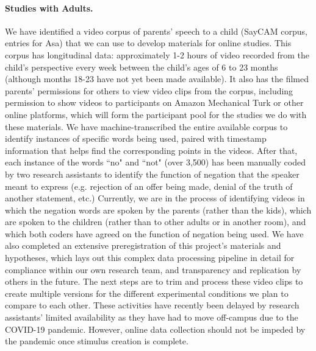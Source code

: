 \documentclass[11pt]{article}
\begin{document}
\paragraph{Studies with Adults.} We have identified a video corpus of parents' speech to a child (SayCAM corpus, entries for Asa) that we can use to develop materials for online studies. This corpus has longitudinal data: approximately 1-2 hours of video recorded from the child's perspective every week between the child's ages of 6 to 23 months (although months 18-23 have not yet been made available). It also has the filmed parents' permissions for others to view video clips from the corpus, including permission to show videos to participants on Amazon Mechanical Turk or other online platforms, which will form the participant pool for the studies we do with these materials. We have machine-transcribed the entire available corpus to identify instances of specific words being used, paired with timestamp information that helps find the corresponding points in the videos. After that, each instance of the words ``no" and ``not" (over 3,500) has been manually coded by two research assistants to identify the function of negation that the speaker meant to express (e.g. rejection of an offer being made, denial of the truth of another statement, etc.) Currently, we are in the process of identifying videos in which the negation words are spoken by the parents (rather than the kids), which are spoken to the children (rather than to other adults or in another room), and which both coders have agreed on the function of negation being used. We have also completed an extensive preregistration of this project's materials and hypotheses, which lays out this complex data processing pipeline in detail for compliance within our own research team, and transparency and replication by others in the future. The next steps are to trim and process these video clips to create multiple versions for the different experimental conditions we plan to compare to each other. These activities have recently been delayed by research assistants' limited availability as they have had to move off-campus due to the COVID-19 pandemic. However, online data collection should not be impeded by the pandemic once stimulus creation is complete.
\end{document}

